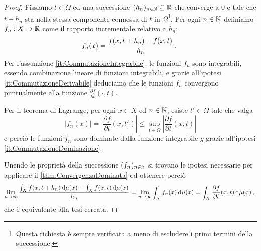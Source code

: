 \begin{proof}
	Fissiamo $t\in\Omega$ ed una successione $(h_n)_{n\in\mathbb N}\subseteq\mathbb R$ che converge a $0$ e tale che $t+h_n$ sta nella stessa componente connessa di $t$ in $\Omega$\footnote{Questa richiesta è sempre verificata a meno di escludere i primi termini della successione.}.
	Per ogni $n\in\mathbb N$ definiamo $f_n:X\to\mathbb R$ come il rapporto incrementale relativo a $h_n$:
	\begin{equation*}
		f_n(x)=\frac{f(x,t+h_n)-f(x,t)}{h_n} \, \text{. }
	\end{equation*}
	Per l'assunzione \ref{it:CommutazioneIntegrabile}, le funzioni $f_n$ sono integrabili, essendo combinazione lineare di funzioni integrabili, e grazie all'ipotesi \ref{it:CommutazioneDerivabile} deduciamo che le funzioni $f_n$ convergono puntualmente alla funzione $\frac{\partial f}{\partial t}({}\cdot,t)$.
	
	Per il teorema di Lagrange, per ogni $x\in X$ ed $n\in\mathbb N$, esiste $t'\in\Omega$ tale che valga
	\begin{equation*}
		\lvert f_n(x)\rvert=\left\lvert\frac{\partial f}{\partial t}(x,t')\right\rvert\le \sup_{t\in\Omega}\left\lvert \frac{\partial f}{\partial t}(x,t)\right\rvert
	\end{equation*}
	e perciò le funzioni $f_n$ sono dominate dalla funzione integrabile $g$ grazie all'ipotesi \ref{it:CommutazioneDominazione}.
	
	Unendo le proprietà della successione $(f_n)_{n\in\mathbb N}$ si trovano le ipotesi necessarie per applicare il \cref{thm:ConvergenzaDominata} ed ottenere perciò
	\begin{equation*}
		\lim_{n\to\infty} \frac{\int_X f(x,t+h_n)\,\mathrm d \mu(x)-\int_X f(x,t)\,\mathrm d\mu(x)}{h_n}=\lim_{n\to\infty} \int_X f_n(x)\,\mathrm d\mu(x)=\int_X \frac{\partial f}{\partial t}(x,t)\,\mathrm d\mu(x)\, \text{, }
	\end{equation*}
	che è equivalente alla tesi cercata.
\end{proof}







